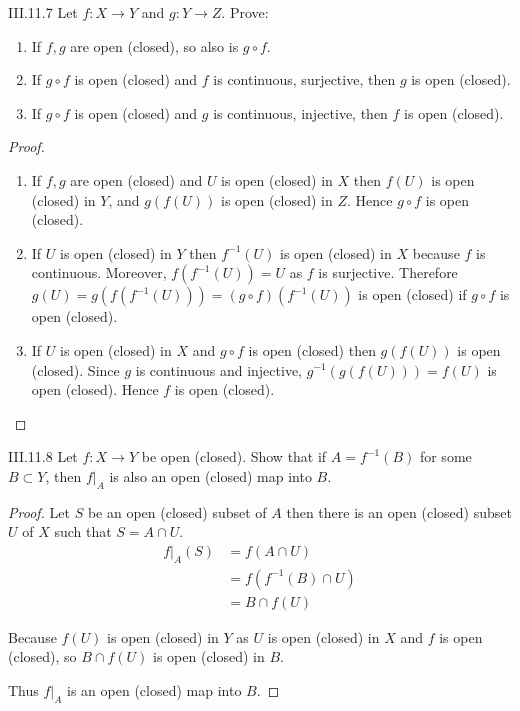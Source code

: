 \begin{problem}{III.11.7}
Let \( f: X \to Y \) and \( g: Y \to Z \). Prove:
\begin{enumerate}[label={(\alph*)}]
	\item If \( f, g \) are open (closed), so also is \( g \circ f \).
	\item If \( g \circ f \) is open (closed) and \( f \) is continuous, surjective, then \( g \) is open (closed).
	\item If \( g \circ f \) is open (closed) and \( g \) is continuous, injective, then \( f \) is open (closed).
\end{enumerate}
\end{problem}

\begin{proof}
	\begin{enumerate}[label={(\alph*)}]
		\item If \( f, g \) are open (closed) and \( U \) is open (closed) in \( X \) then \( f(U) \) is open (closed) in \( Y \), and \( g(f(U)) \) is open (closed) in \( Z \). Hence \( g \circ f \) is open (closed).
		\item If \( U \) is open (closed) in \( Y \) then \( f^{-1}(U) \) is open (closed) in \( X \) because \( f \) is continuous. Moreover, \( f(f^{-1}(U)) = U \) as \( f \) is surjective. Therefore \( g(U) = g(f(f^{-1}(U))) = (g\circ f)(f^{-1}(U)) \) is open (closed) if \( g\circ f \) is open (closed).
		\item If \( U \) is open (closed) in \( X \) and \( g \circ f \) is open (closed) then \( g(f(U)) \) is open (closed). Since \( g \) is continuous and injective, \( g^{-1}(g(f(U))) = f(U) \) is open (closed). Hence \( f \) is open (closed).
	\end{enumerate}
\end{proof}

\begin{problem}{III.11.8}\label{problem:III.11.8}
Let \( f: X \to Y \) be open (closed). Show that if \( A = f^{-1}(B) \) for some \( B \subset Y \), then \( f\vert_{A} \) is also an open (closed) map into \( B \).
\end{problem}

\begin{proof}
	Let \( S \) be an open (closed) subset of \( A \) then there is an open (closed) subset \( U \) of \( X \) such that \( S = A \cap U \).
	\begingroup
	\allowdisplaybreaks%
	\begin{align*}
		f\vert_{A}(S) & = f(A \cap U)         \\
		              & = f(f^{-1}(B) \cap U) \\
		              & = B \cap f(U)
	\end{align*}
	\endgroup

	Because \( f(U) \) is open (closed) in \( Y \) as \( U \) is open (closed) in \( X \) and \( f \) is open (closed), so \( B \cap f(U) \) is open (closed) in \( B \).

	Thus \( f\vert_{A} \) is an open (closed) map into \( B \).
\end{proof}

